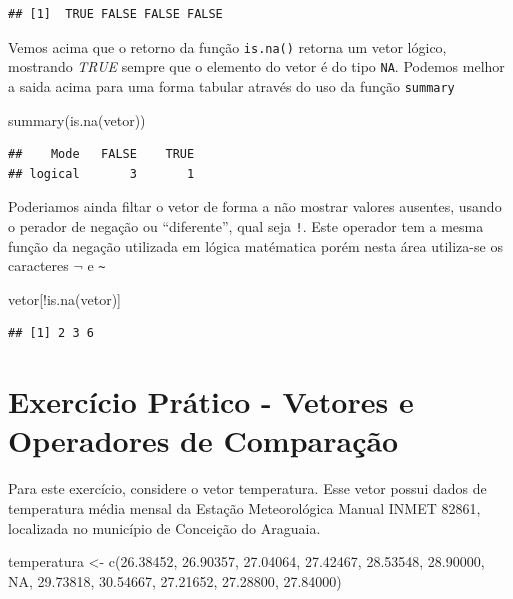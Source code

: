 \documentclass[
]{article}
\newenvironment{Shaded}{\begin{snugshade}}{\end{snugshade}}
\newcommand{\ConstantTok}[1]{\textcolor[rgb]{0.00,0.00,0.00}{#1}}
\newcommand{\FloatTok}[1]{\textcolor[rgb]{0.00,0.00,0.81}{#1}}
\newcommand{\FunctionTok}[1]{\textcolor[rgb]{0.00,0.00,0.00}{#1}}
\newcommand{\NormalTok}[1]{#1}
\newcommand{\OtherTok}[1]{\textcolor[rgb]{0.56,0.35,0.01}{#1}}
\newcommand{\SpecialCharTok}[1]{\textcolor[rgb]{0.00,0.00,0.00}{#1}}
\begin{document}
\begin{verbatim}
## [1]  TRUE FALSE FALSE FALSE
\end{verbatim}

Vemos acima que o retorno da função \texttt{is.na()} retorna um vetor
lógico, mostrando \emph{TRUE} sempre que o elemento do vetor é do tipo
\texttt{NA}. Podemos melhor a saida acima para uma forma tabular através
do uso da função \texttt{summary}

\begin{Shaded}
\begin{Highlighting}[]
\FunctionTok{summary}\NormalTok{(}\FunctionTok{is.na}\NormalTok{(vetor))}
\end{Highlighting}
\end{Shaded}

\begin{verbatim}
##    Mode   FALSE    TRUE 
## logical       3       1
\end{verbatim}

Poderiamos ainda filtar o vetor de forma a não mostrar valores ausentes,
usando o perador de negação ou ``diferente'', qual seja \texttt{!}. Este
operador tem a mesma função da negação utilizada em lógica matématica
porém nesta área utiliza-se os caracteres \(\neg\) e
\texttt{\textasciitilde{}}

\begin{Shaded}
\begin{Highlighting}[]
\NormalTok{vetor[}\SpecialCharTok{!}\FunctionTok{is.na}\NormalTok{(vetor)]}
\end{Highlighting}
\end{Shaded}

\begin{verbatim}
## [1] 2 3 6
\end{verbatim}

\hypertarget{exercuxedcio-pruxe1tico---vetores-e-operadores-de-comparauxe7uxe3o}{%
\section{Exercício Prático - Vetores e Operadores de
Comparação}\label{exercuxedcio-pruxe1tico---vetores-e-operadores-de-comparauxe7uxe3o}}

Para este exercício, considere o vetor temperatura. Esse vetor possui
dados de temperatura média mensal da Estação Meteorológica Manual INMET
82861, localizada no município de Conceição do Araguaia.

\begin{Shaded}
\begin{Highlighting}[]
\NormalTok{temperatura }\OtherTok{\textless{}{-}} \FunctionTok{c}\NormalTok{(}\FloatTok{26.38452}\NormalTok{, }\FloatTok{26.90357}\NormalTok{, }\FloatTok{27.04064}\NormalTok{, }\FloatTok{27.42467}\NormalTok{, }
                 \FloatTok{28.53548}\NormalTok{, }\FloatTok{28.90000}\NormalTok{, }\ConstantTok{NA}\NormalTok{, }\FloatTok{29.73818}\NormalTok{, }
                 \FloatTok{30.54667}\NormalTok{, }\FloatTok{27.21652}\NormalTok{, }\FloatTok{27.28800}\NormalTok{, }\FloatTok{27.84000}\NormalTok{)}
\end{Highlighting}
\end{Shaded}
\end{document}

